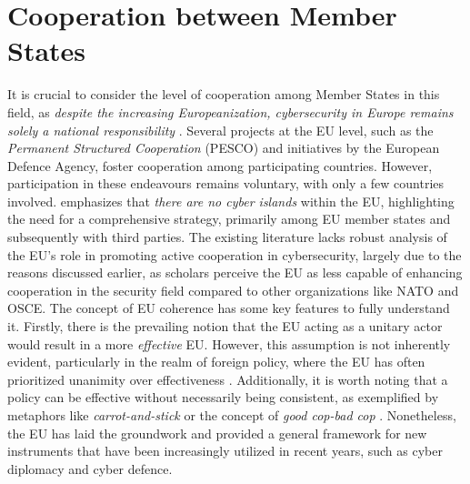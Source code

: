\section{Cooperation between Member States}

It is crucial to consider the level of cooperation among Member States in this field, as \textit{despite the increasing Europeanization, cybersecurity in Europe remains solely a national responsibility} \autocite[13]{renard_2014_european}. Several projects at the EU level, such as the \textit{Permanent Structured Cooperation} (PESCO) and initiatives by the European Defence Agency, foster cooperation among participating countries. However, participation in these endeavours remains voluntary, with only a few countries involved. \textcite{kasper_2021_the} emphasizes that \textit{there are no cyber islands} within the EU, highlighting the need for a comprehensive strategy, primarily among EU member states and subsequently with third parties.  The existing literature lacks robust analysis of the EU's role in promoting active cooperation in cybersecurity, largely due to the reasons discussed earlier, as scholars perceive the EU as less capable of enhancing cooperation in the security field compared to other organizations like NATO and OSCE. The concept of EU coherence has some key features to fully understand it. Firstly, there is the prevailing notion that the EU acting as a unitary actor would result in a more \textit{effective} EU. However, this assumption is not inherently evident, particularly in the realm of foreign policy, where the EU has often prioritized unanimity over effectiveness \autocite[5]{missiroli_2001_occasional}. Additionally, it is worth noting that a policy can be effective without necessarily being consistent, as exemplified by metaphors like \textit{carrot-and-stick} or the concept of \textit{good cop-bad cop} \autocite[5]{missiroli_2001_occasional}. Nonetheless, the EU has laid the groundwork and provided a general framework for new instruments that have been increasingly utilized in recent years, such as cyber diplomacy and cyber defence.

